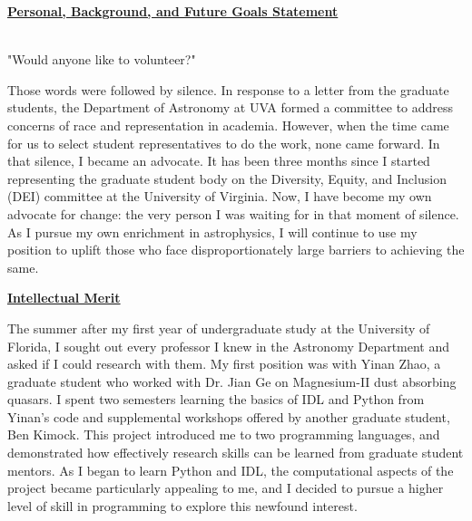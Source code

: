 \documentclass[11pt]{article}
\title{\vspace{-1.5in}}
\author{}
\date{}
\begin{document}
\maketitle

\thispagestyle{empty}
\centerline{\underline{\textbf{Personal, Background, and Future Goals Statement}}}


\hspace{0.5cm}\\
"Would anyone like to volunteer?"

Those words were followed by silence. In response to a letter from the graduate students, the Department of Astronomy at UVA formed a committee to address concerns of race and representation in academia. However, when the time came for us to select student representatives to do the work, none came forward. In that silence, I became an advocate. It has been three months since I started representing the graduate student body on the Diversity, Equity, and Inclusion (DEI) committee at the University of Virginia. Now, I have become my own advocate for change: the very person I was waiting for in that moment of silence. As I pursue my own enrichment in astrophysics, I will continue to use my position to uplift those who face disproportionately large barriers to achieving the same.

\noindent \textbf{\underline{Intellectual Merit}}

The summer after my first year of undergraduate study at the University of Florida, I sought out every professor I knew in the Astronomy Department and asked if I could research with them. My first position was with Yinan Zhao, a graduate student who worked with Dr. Jian Ge on Magnesium-II dust absorbing quasars. I spent two semesters learning the basics of IDL and Python from Yinan's code and supplemental workshops offered by another graduate student, Ben Kimock. This project introduced me to two programming languages, and demonstrated how effectively research skills can be learned from graduate student mentors. As I began to learn Python and IDL, the computational aspects of the project became particularly appealing to me, and I decided to pursue a higher level of skill in programming to explore this newfound interest.
\end{document}
